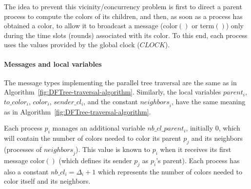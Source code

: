 \documentclass[11pt,english]{article}
\newcommand{\neighbors}{\mathit{neighbors}}
\newcommand{\CLOCK}{\mathit{CLOCK}}
\begin{document}
The idea to prevent this vicinity/concurrency problem is first to
direct a parent process to compute the colors of its children, and
then, as soon as a process has obtained a color, to allow it to broadcast 
a message ({\sc color}$()$ or {\sc term}$()$) only during the time slots
(rounds) associated with its color.  To this end, each process uses
the values provided by the global clock ($\CLOCK$).


\paragraph{Messages and local variables}
The message types implementing the parallel tree traversal are the
same as in Algorithm~\ref{fig:DFTree-traversal-algorithm}.  Similarly,
the local variables $parent_i$, $to\_color_i$, $color_i$,
$sender\_cl_i$, and the constant $\neighbors_i$, have the same meaning
as in Algorithm~\ref{fig:DFTree-traversal-algorithm}.

Each process $p_i$ manages an additional variable $nb\_cl\_parent_i$,
initially $0$, which will contain the number of colors needed to color
its parent $p_j$ and its neighbors (processes of $\neighbors_j$). This
value is known to $p_i$ when it receives its first message {\sc
  color}$()$ (which defines its sender $p_j$ as $p_i$'s parent). Each
process has also a constant $nb\_cl_i=\Delta_i+1$ which represents the
number of colors needed to color itself and its neighbors.
\end{document}
